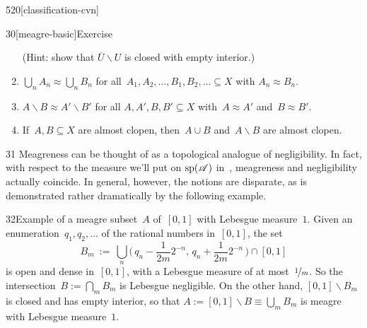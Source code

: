 \begin{parsec}{520}[classification-cvn]
\begin{point}{30}[meagre-basic]{Exercise}
\begin{enumerate}
(Hint: show that $\overline{U}\backslash U$
is closed with empty interior.)
\item
$\bigcup_n A_n\approx \bigcup_n B_n$
for all~$A_1,A_2,\dotsc, B_1,B_2,\dotsc\subseteq X$
with $A_n\approx B_n$.
\item
$A\backslash B \approx A'\backslash B'$
for all $A,A',B,B'\subseteq X$
with~$A\approx A'$ and~$B\approx B'$.
\item
If~$A,B\subseteq X$ are almost clopen,
then~$A\cup B$ and~$A\backslash B$ 
are almost clopen.
\end{enumerate}
\end{point}
\begin{point}{31}%
Meagreness can be thought of as a topological analogue of negligibility.
In fact, with respect to the measure we'll put on $\mathrm{sp}(\mathscr{A})$
in~,
    meagreness and negligibility actually coincide.
In general, however, 
the notions are disparate,
as is demonstrated rather dramatically by the following example.
\end{point}
\begin{point}{32}{Example}
of a meagre subset~$A$ of~$[0,1]$
with Lebesgue measure~$1$.
Given an enumeration~$q_1,q_2,\dotsc$
    of the rational numbers in~$[0,1]$,
the set
\begin{equation*}
    \textstyle
    B_m \ :=\  \bigcup_n 
    \bigl(\,q_n-\frac{1}{2m}2^{-n},\,q_n+\frac{1}{2m}2^{-n}\,\bigr)
    \cap[0,1]
\end{equation*}
is open and dense in~$[0,1]$, with a Lebesgue measure 
of at most~$\nicefrac{1}{m}$.
So the intersection~$B:=\bigcap_m B_m$ is Lebesgue negligible.
On the other hand, $[0,1]\backslash B_m$
is closed and has empty interior,
so that $A:=[0,1]\backslash B\equiv \bigcup_m B_m$
is meagre with Lebesgue measure~$1$.
\end{point}
\end{parsec}
